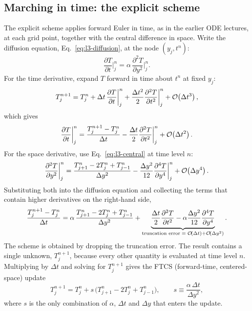 \subsection{Marching in time: the explicit scheme}
\label{sec:l3-fd-time}

The explicit scheme applies forward Euler in time, as in the earlier ODE lectures, at each grid point, together with the central difference in space. Write the diffusion equation, Eq.~\eqref{eq:l3-diffusion}, at the node $(y_j,t^n)$:
\begin{equation}
\frac{\partial T}{\partial t}\bigg|_j^n=\alpha\,\frac{\partial^2T}{\partial y^2}\bigg|_j^n.
\end{equation}
For the time derivative, expand $T$ forward in time about $t^n$ at fixed $y_j$:
\begin{equation}
T_j^{n+1}=T_j^n+\Delta t\,\frac{\partial T}{\partial t}\bigg|_j^n+\frac{\Delta t^2}{2}\frac{\partial^2T}{\partial t^2}\bigg|_j^n+\mathcal{O}\!\left(\Delta t^3\right),
\end{equation}
which gives
\begin{equation}
\frac{\partial T}{\partial t}\bigg|_j^n=\frac{T_j^{n+1}-T_j^n}{\Delta t}-\frac{\Delta t}{2}\frac{\partial^2T}{\partial t^2}\bigg|_j^n+\mathcal{O}\!\left(\Delta t^2\right).
\end{equation}
For the space derivative, use Eq.~\eqref{eq:l3-central} at time level $n$:
\begin{equation}
\frac{\partial^2T}{\partial y^2}\bigg|_j^n=\frac{T_{j+1}^n-2T_j^n+T_{j-1}^n}{\Delta y^2}-\frac{\Delta y^2}{12}\frac{\partial^4T}{\partial y^4}\bigg|_j^n+\mathcal{O}\!\left(\Delta y^4\right).
\end{equation}
Substituting both into the diffusion equation and collecting the terms that contain higher derivatives on the right-hand side,
\begin{equation}
\frac{T_j^{n+1}-T_j^n}{\Delta t}=\alpha\,\frac{T_{j+1}^n-2T_j^n+T_{j-1}^n}{\Delta y^2}+\underbrace{\frac{\Delta t}{2}\frac{\partial^2T}{\partial t^2}-\alpha\frac{\Delta y^2}{12}\frac{\partial^4T}{\partial y^4}}_{\text{truncation error}\;=\;\mathcal{O}\!\left(\Delta t\right)+\mathcal{O}\!\left(\Delta y^2\right)}.
\end{equation}
The scheme is obtained by dropping the truncation error. The result contains a single unknown, $T_j^{n+1}$, because every other quantity is evaluated at time level $n$. Multiplying by $\Delta t$ and solving for $T_j^{n+1}$ gives the FTCS (forward-time, centered-space) update
\begin{equation}
T_j^{n+1}=T_j^n+s\,\big(T_{j+1}^n-2T_j^n+T_{j-1}^n\big),\qquad s\equiv\frac{\alpha\,\Delta t}{\Delta y^2},
\label{eq:l3-ftcs}
\end{equation}
where $s$ is the only combination of $\alpha$, $\Delta t$ and $\Delta y$ that enters the update.

